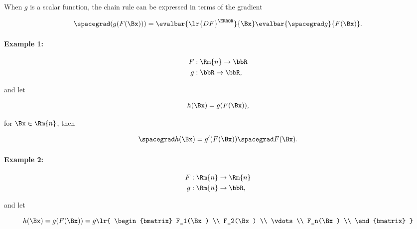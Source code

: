 When \( g \) is a scalar function, the chain rule can be expressed in terms of the 
gradient

\begin{dmath}\label{eqn:convex-optimizationLecture2:724}
\spacegrad 
(g(F(\Bx)))
=
\evalbar{\lr{
D F
}^\T}{\Bx}
\evalbar{\spacegrad g}{F(\Bx)}.
\end{dmath}


\paragraph{Example 1:}

\begin{dmath}\label{eqn:convex-optimizationLecture2:524}
\begin{aligned}
F &: \Rm{n} \rightarrow \bbR \\
g &: \bbR \rightarrow \bbR,
\end{aligned}
\end{dmath}

and let

\begin{dmath}\label{eqn:convex-optimizationLecture2:544}
h(\Bx) = g(F(\Bx)),
\end{dmath}

for \( \Bx \in \Rm{n} \), then

\begin{dmath}\label{eqn:convex-optimizationLecture2:564}
\spacegrad h(\Bx)
=
g'(F(\Bx)) \spacegrad F(\Bx).
\end{dmath}

\paragraph{Example 2:}

\begin{dmath}\label{eqn:convex-optimizationLecture2:584}
\begin{aligned}
F &: \Rm{n} \rightarrow \Rm{n} \\
g &: \Rm{n} \rightarrow \bbR,
\end{aligned}
\end{dmath}

and let

\begin{dmath}\label{eqn:convex-optimizationLecture2:604}
h(\Bx)
= g(F(\Bx))
= g\lr{
\begin{bmatrix}
F_1(\Bx) \\
F_2(\Bx) \\
\vdots \\
F_n(\Bx) \\
\end{bmatrix}
}
\end{dmath}

